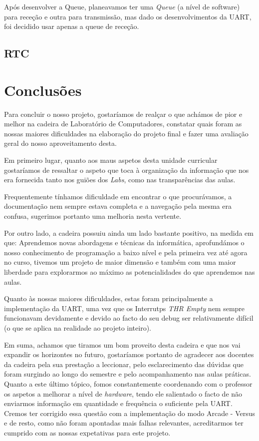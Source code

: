 \documentclass{report}
\begin{document}
Após desenvolver a Queue, planeavamos ter uma \textit{Queue} (a nível de software) para receção e outra para transmissão, mas dado os desenvolvimentos da UART, foi decidido usar apenas a queue de receção.

\section{RTC}

\chapter{Conclusões}

Para concluir o nosso projeto, gostaríamos de realçar o que achámos de pior e melhor na cadeira de Laboratório de Computadores, constatar quais foram as nossas maiores dificuldades na elaboração do projeto final e fazer uma avaliação geral do nosso aproveitamento desta.

Em primeiro lugar, quanto aos maus aspetos desta unidade curricular gostaríamos de ressaltar o aspeto que toca à organização da informação que nos era fornecida tanto nos guiões dos \textit{Labs}, como nas transparências das aulas. 

Frequentemente tínhamos dificuldade em encontrar o que procurávamos, a documentação nem sempre estava completa e a navegação pela mesma era confusa, sugerimos portanto uma melhoria nesta vertente.

Por outro lado, a cadeira possuiu ainda um lado bastante positivo, na medida em que: Aprendemos novas abordagens e técnicas da informática, aprofundámos o nosso conhecimento de programação a baixo nível e pela primeira vez até agora no curso, tivemos um projeto de maior dimensão e também com uma maior liberdade para explorarmos ao máximo as potencialidades do que aprendemos nas aulas.

Quanto às nossas maiores dificuldades, estas foram principalmente a implementação da UART, uma vez que os Interrutps \textit{THR Empty} nem sempre funcionavam devidamente e devido ao facto do seu debug ser relativamente difícil (o que se aplica na realidade ao projeto inteiro).

Em suma, achamos que tiramos um bom proveito desta cadeira e que nos vai expandir os horizontes no futuro, gostaríamos portanto de agradecer aos docentes da cadeira pela sua prestação a leccionar, pelo esclarecimento das dúvidas que foram surgindo ao longo do semestre e pelo acompanhamento nas aulas práticas. Quanto a este último tópico, fomos constantemente coordenando com o professor os aspetos a melhorar a nível de \textit{hardware}, tendo ele salientado o facto de não enviarmos informação em quantidade e frequência o suficiente pela UART. Cremos ter corrigido essa questão com a implementação do modo Arcade - Versus e de resto, como não foram apontadas mais falhas relevantes, acreditarmos ter cumprido com as nossas expetativas para este projeto.

\paragraph{}
\end{document}
